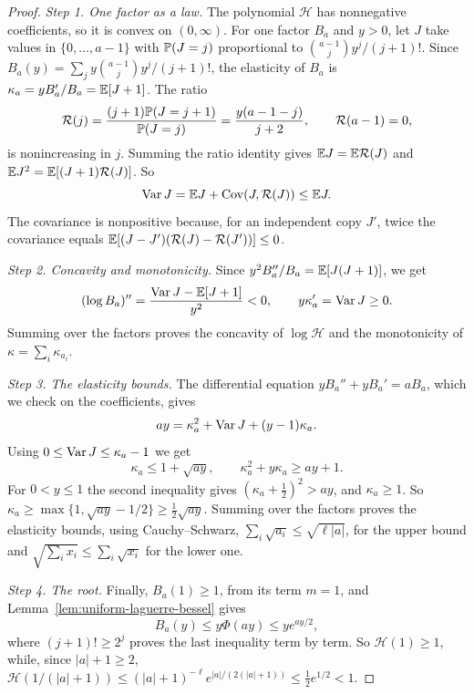 \begin{proof}
\emph{Step 1. One factor as a law.} The polynomial $\mathcal H$ has
nonnegative coefficients, so it is convex on $(0,\infty)$. For one factor $B_a$ and $y>0$, let $J$ take values in
$\{0,\ldots,a-1\}$ with $\mathbb P(J=j)$ proportional to $\binom{a-1}{j}y^j/(j+1)!$.
Since $B_a(y)=\sum_jy\binom{a-1}jy^j/(j+1)!$, the elasticity of $B_a$ is
$\kappa_a=yB_a'/B_a=\mathbb E[J+1]$. The ratio
\[
\mathcal R(j)=\frac{(j+1)\mathbb P(J=j+1)}{\mathbb P(J=j)}=\frac{y(a-1-j)}{j+2},
\qquad \mathcal R(a-1)=0,
\]
is nonincreasing in $j$. Summing the ratio identity gives
$\mathbb E J=\mathbb E \mathcal R(J)$ and $\mathbb E J^2=\mathbb E[(J+1)\mathcal R(J)]$. So
\[
 \operatorname{Var} J=\mathbb E J+\operatorname{Cov}(J,\mathcal R(J))\le \mathbb E J.
\]
The covariance is nonpositive because, for an independent copy $J'$,
twice the covariance equals $\mathbb E[(J-J')(\mathcal R(J)-\mathcal R(J'))]\le0$.

\emph{Step 2. Concavity and monotonicity.} Since
$y^2B_a''/B_a=\mathbb E[J(J+1)]$, we get
\[
 (\log B_a)''=\frac{\operatorname{Var} J-\mathbb E[J+1]}{y^2}<0,
 \qquad y\kappa_a'=\operatorname{Var} J\ge0.
\]
Summing over the factors proves the concavity of $\log\mathcal H$ and the monotonicity
of $\kappa=\sum_i\kappa_{a_i}$.

\emph{Step 3. The elasticity bounds.} The differential equation
$yB_a''+yB_a'=aB_a$, which we check on the coefficients, gives
\[
 ay=\kappa_a^2+\operatorname{Var} J+(y-1)\kappa_a.
\]
Using $0\le\operatorname{Var} J\le\kappa_a-1$ we get
\[
 \kappa_a\le1+\sqrt{ay},\qquad \kappa_a^2+y\kappa_a\ge ay+1.
\]
For $0<y\le1$ the second inequality gives $(\kappa_a+\frac12)^2>ay$, and
$\kappa_a\ge1$. So $\kappa_a\ge\max\{1,\sqrt{ay}-1/2\}\ge\tfrac12\sqrt{ay}$.
Summing over the factors proves the elasticity bounds, using
Cauchy--Schwarz, $\sum_i\sqrt{a_i}\le\sqrt{\ell|a|}$, for the upper bound and
$\sqrt{\sum_ix_i}\le\sum_i\sqrt{x_i}$ for the lower one.

\emph{Step 4. The root.} Finally, $B_a(1)\ge1$, from its term $m=1$, and
Lemma~\ref{lem:uniform-laguerre-bessel} gives
\[
 B_a(y)\le y\Phi(ay)\le y e^{ay/2},
\]
where $(j+1)!\ge2^j$ proves the last inequality term by term.
So $\mathcal H(1)\ge1$, while, since $|a|+1\ge2$,
$\mathcal H(1/(|a|+1))\le(|a|+1)^{-\ell}e^{|a|/(2(|a|+1))}\le\frac12e^{1/2}<1$.
\end{proof}


